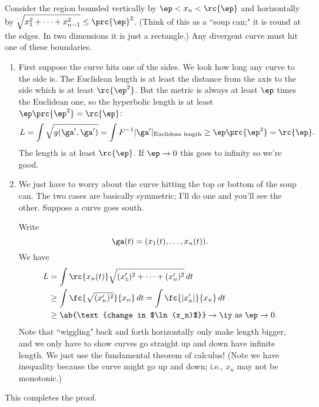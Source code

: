 Consider the region bounded vertically by $\ep<x_n<\rc{\ep}$ and horizontally by $\sqrt{x_1^2+\cdots + x_{n-1}^2}\le\prc{\ep}^2$. (Think of this as a ``soup can;" it is round at the edges. In two dimensions it is just a rectangle.) Any divergent curve must hit one of these boundaries. %
\begin{enumerate}
\item
First suppose the curve hits one of the sides. 
We look how long any curve to the side is. 
The Euclidean length is at least the distance from the axis to the side which is at least $\rc{\ep^2}$. But the metric is always at least $\ep$ times the Euclidean one, so the hyperbolic length is at least $\ep\prc{\ep^2}=\rc{\ep}$:
\[
L=\int \sqrt{g(\ga',\ga')}=\int F^{-1}|\ga'|_{\text{Euclidean length}}\ge \ep\prc{\ep^2}=\rc{\ep}.
\]
The length is at least $\rc{\ep}$. If $\ep\to 0$ this goes to infinity so we're good.
\item
We just have to worry about the curve hitting the top or bottom of the soup can.  %
The two cases are basically symmetric; I'll do one and you'll see the other. Suppose a curve goes south.


Write
\[
\ga(t)=(x_1(t),\ldots,x_n(t)).
\]
We have 
\begin{align*}
L&=\int \rc{x_n(t)} \sqrt{(x_1')^2+\cdots +(x_n')^2}\,dt\\
&\ge\int \fc{\sqrt{(x_n')^2}}{x_n}\,dt =\int \fc{|x_n'|}{x_n}\,dt\\
&\ge \ab{\text{change in $\ln (x_n)$}}\to \iy \text{ as }\ep\to 0.
\end{align*}
Note that ``wiggling" back and forth horizontally only make length bigger, and we only have to show curves go straight up and down have infinite length. We just use the fundamental theorem of calculus! (Note we have inequality because the curve might go up and down; i.e., $x_n$ may not be monotonic.)
\end{enumerate}




This completes the proof.
